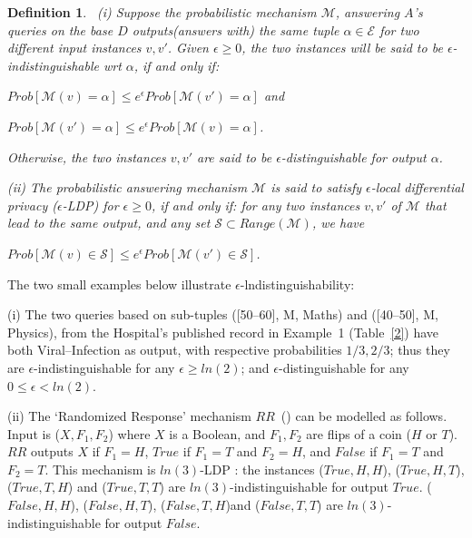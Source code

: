 \documentclass[pdflatex]{article}
\def \E {{\mathcal{E}}}
\def \M {{\mathcal{M}}}
\def \S {{\mathcal{S}}}
\newtheorem{defn}{Definition}
\def \lft {\noindent}
\begin{document}
  \vspace*{-1mm}
 \begin{defn}~\label{eps-indistinguish}
   (i) Suppose the probabilistic mechanism $\M$,  answering $A$'s queries  on the
   base $D$   outputs(answers with) the same  tuple  $\alpha \in \E$ for  two different
   input   instances $v, v'$.   Given $\epsilon \ge 0$, the two instances will be said
   to be  $\epsilon$-indistinguishable wrt $\alpha$, if and only if: \par   
   \hspace*{2.5cm} $ Prob[\M(v) = \alpha]  \le e^{\epsilon} Prob[\M(v') = \alpha]$ and  \par 
   \hspace*{2.5cm} $ Prob[\M(v') = \alpha]  \le e^{\epsilon} Prob[\M(v) = \alpha]$. \par\lft 
   Otherwise, the two  instances  $v, v'$ are said to be $\epsilon$-distinguishable
   for output $\alpha$. 
   
   (ii) The probabilistic answering mechanism $\M$ is said to  satisfy
   {\em $\epsilon$-local differential privacy} {\em($\epsilon$-LDP)}  for $\epsilon \ge 0$,
   if and only if: for any two instances  $v, v'$ of   $\M$ {\em that lead to  the same
     output},   and any set   $\S \subset Range(\M)$, we have \par 
   \hspace*{2.5cm} $ Prob[\M(v) \in \S ]  \le e^{\epsilon} Prob[\M(v') \in \S]$.
   \end{defn}

   \vspace*{-1.5mm}
  The two small examples below illustrate  $\epsilon$-lndistinguishability:

  (i) The  two queries based on sub-tuples ([50--60], M, Maths) and   ([40--50], M,
  Physics), from the Hospital's  published record in Example~1  (Table~\ref{2}) 
  have both Viral--Infection as output, with respective  probabilities  $1/3, 2/3$;
  thus they are  $\epsilon$-indistinguishable for any  $\epsilon \ge ln(2)$; and
  $\epsilon$-distinguishable for any $0 \le \epsilon < ln(2)$. 
  

   (ii) The `Randomized Response' mechanism $RR$~(\cite{Warner65}) can be 
  modelled as follows. Input is ($X, F_1, F_2$) where $X$ is a Boolean, and $F_1, F_2$
  are flips of a coin ($H$ or $T$). $RR$ outputs $X$ if $F_1=H$, $True$ if
  $F_1=T$ and $F_2=H$, and $False$ if $F_1=T$ and $F_2=T$. This mechanism is
  $ln(3)$-LDP : the instances ($True, H, H$), ($True, H, T$), ($True, T,
  H$) and ($True, T, T$) are $ln(3)$-indistinguishable for output $True$.
  ($False, H, H$), ($False, H, T$), ($False, T, H$)and ($False, T, T$) are
  $ln(3)$-indistinguishable for output $False$.
\end{document}
